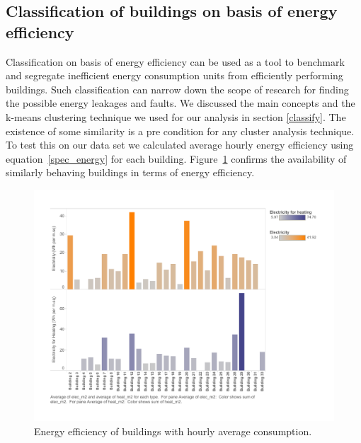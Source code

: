 \subsection{Classification of buildings on basis of energy efficiency}
Classification on basis of energy efficiency can be used as a tool to benchmark and segregate inefficient energy consumption units from efficiently performing buildings. Such classification can narrow down the scope of research for finding the possible energy leakages and faults. We discussed the main concepts and the k-means clustering technique we used for our analysis in section \ref{classify}. The existence of some similarity is a pre condition for any cluster analysis technique. To test this on our data set we calculated average hourly energy efficiency using equation~\ref{spec_energy} for each building. Figure~\ref{fig:hr_m2} confirms the availability of similarly behaving buildings in terms of energy efficiency. 
\begin{figure}[!ht]
    \begin{center}
      \includegraphics[scale = 0.6]{images/hr_m2.pdf}
      \caption{Energy efficiency of buildings with hourly average consumption.}
      \label{fig:hr_m2}
    \end{center}
\end{figure} 


